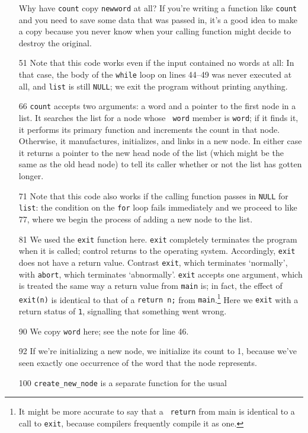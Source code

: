 \begin{itemize}
Why have {\tt count} copy {\tt newword} at all?  If you're writing a
function like {\tt count} and you need to save some data that was passed
in, it's a good idea to make a copy because you never know when your
calling function might decide to destroy the original.

\item[51] Note that this code works even if the input contained no words
at all:  In that case, the body of the {\tt while} loop on lines 44--49
was never executed at all, and {\tt list} is still {\tt NULL}; we exit
the program without printing anything.  
\item[66] {\tt count} accepts two arguments:  a word and a pointer to
the first node in a list.  It searches the list for a node whose {\tt
word} member is {\tt word}; if it finds it, it performs its primary
function and increments the count in that node.  Otherwise, it
manufactures, initializes, and links in a new node.  In either case it
returns a pointer to the new head node of the list (which might be the
same as the old head node) to tell its caller whether or not the list
has gotten longer.
\item[71] Note that this code also works if the calling function passes
in {\tt NULL} for {\tt list}:  the condition on the {\tt for} loop fails
immediately and we proceed to like 77, where we begin the process of
adding a new node to the list.
\item[81] We used the {\tt exit} function here.  {\tt exit} completely
terminates the program when it is called; control returns to the
operating system.  Accordingly, {\tt exit} does not have a return value.
Contrast {\tt exit}, which terminates `normally', with {\tt abort},
which terminates `abnormally'.  {\tt exit} accepts one argument, which
is treated the same way a return value from {\tt main} is; in fact, the
effect of {\tt exit(n)} is identical to that of a {\tt return n;} from
{\tt main}.\footnote{It might be more accurate to say that a {\tt
return} from main is identical to a call to {\tt exit}, because
compilers frequently compile it as one.} Here we {\tt exit} with a
return status of {\tt 1}, signalling that something went wrong.
\item[90]  We copy {\tt word} here; see the note for line 46.
\item[92] If we're initializing a new node, we initialize its count to
1, because we've seen exactly one occurrence of the word that the node
represents. 
\item[100] {\tt create\_new\_node} is a separate function for the usual

\end{itemize}
